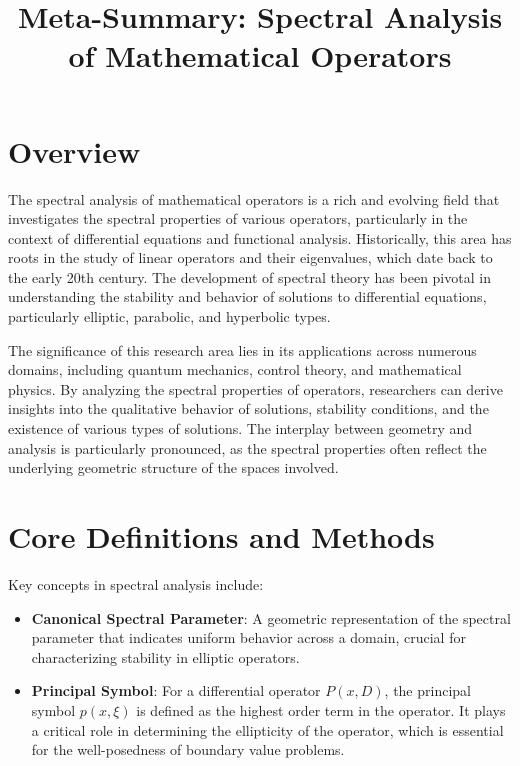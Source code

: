 \documentclass[11pt,a4paper]{article}
\title{Meta-Summary: Spectral Analysis of Mathematical Operators}
\date{}
\begin{document}
\maketitle

\section{Overview}
The spectral analysis of mathematical operators is a rich and evolving field that investigates the spectral properties of various operators, particularly in the context of differential equations and functional analysis. Historically, this area has roots in the study of linear operators and their eigenvalues, which date back to the early 20th century. The development of spectral theory has been pivotal in understanding the stability and behavior of solutions to differential equations, particularly elliptic, parabolic, and hyperbolic types.

The significance of this research area lies in its applications across numerous domains, including quantum mechanics, control theory, and mathematical physics. By analyzing the spectral properties of operators, researchers can derive insights into the qualitative behavior of solutions, stability conditions, and the existence of various types of solutions. The interplay between geometry and analysis is particularly pronounced, as the spectral properties often reflect the underlying geometric structure of the spaces involved.

\section{Core Definitions and Methods}
Key concepts in spectral analysis include:

\begin{itemize}
\item \textbf{Canonical Spectral Parameter}: A geometric representation of the spectral parameter that indicates uniform behavior across a domain, crucial for characterizing stability in elliptic operators.
\end{itemize}

\begin{itemize}
\item \textbf{Principal Symbol}: For a differential operator \( P(x, D) \), the principal symbol \( p(x, \xi) \) is defined as the highest order term in the operator. It plays a critical role in determining the ellipticity of the operator, which is essential for the well-posedness of boundary value problems.
\end{itemize}
\end{document}
